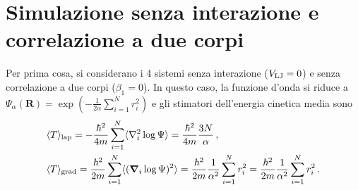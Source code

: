 \documentclass[a4paper, titlepage]{article}
\begin{document}
\section{Simulazione senza interazione e correlazione a due corpi}
Per prima cosa, si considerano i 4 sistemi senza interazione ($V_{\rm LJ} = 0$) e senza correlazione a due corpi ($\beta_1 = 0$). In questo caso, la funzione d'onda si riduce a $\Psi_\alpha(\mathbf{R}) = \exp(-\frac{1}{2\alpha}\sum_{i = 1}^Nr_i^2)$ e gli stimatori dell'energia cinetica media sono
\begin{align*}
    &\langle T \rangle _{\rm lap} = -\frac{\hbar^2}{4m}
    \sum_{i = 1}^N
    \langle\nabla_i^2\log\Psi\rangle = \frac{\hbar^2}{4m} \frac{3N}{\alpha}\, ,\\
    &\langle T \rangle _{\rm grad} = \frac{\hbar^2}{2m}
    \sum_{i = 1}^N
    \langle(\boldsymbol{\nabla}_i\log\Psi)^2\rangle =
    \frac{\hbar^2}{2m} \frac{1}{\alpha^2}
    \sum_{i=1}^N r_i^2 = \frac{\hbar^2}{2m} \frac{1}{\alpha^2}\sum_{i=1}^N r_i^2\, .
\end{align*}
\end{document}
